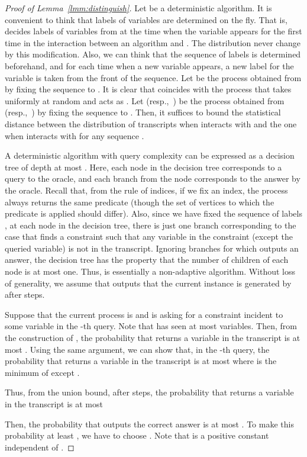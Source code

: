 \documentclass[letterpaper, 11pt]{article}
\begin{document}
\begin{proof}[Proof of Lemma~\ref{lmm:distinguish}]
  Let  be a deterministic algorithm.
  It is convenient to think that labels of variables are determined on the fly.
  That is,  decides labels of variables from  at the time when the variable appears for the first time in the interaction between an algorithm and .
  The distribution never change by this modification.
  Also, 
  we can think that the sequence of labels is determined beforehand,
  and for each time when a new variable appears,
  a new label for the variable is taken from the front of the sequence.
  Let  be the process obtained from  by fixing the sequence to .
  It is clear that  coincides with the process that takes  uniformly at random and acts as .
  Let  (resp.,~) be the process obtained from  (resp.,~) by fixing the sequence to .
  Then, it suffices to bound the statistical distance between the distribution of transcripts when  interacts with  and the one when  interacts with  for any sequence .

  A deterministic algorithm  with query complexity  can be expressed as a decision tree of depth at most .
  Here, each node in the decision tree corresponds to a query to the oracle,
  and each branch from the node corresponds to the answer by the oracle.
  Recall that, from the rule of indices,
  if we fix an index,
  the process always returns the same predicate (though the set of vertices to which the predicate is applied should differ).
  Also, 
  since we have fixed the sequence of labels ,
  at each node in the decision tree,  
  there is just one branch corresponding to the case that  finds a constraint such that any variable in the constraint (except the queried variable) is not in the transcript.
  Ignoring branches for which  outputs an answer,
  the decision tree has the property that the number of children of each node is at most one.
  Thus,  is essentially a non-adaptive algorithm.
  Without loss of generality,
  we assume that  outputs that the current instance is generated by  after  steps.
  
  Suppose that the current process is  and  is asking for a constraint incident to some variable in the -th query.
  Note that  has seen at most  variables.
  Then, from the construction of ,
  the probability that  returns a variable in the transcript is at most .
  Using the same argument,
  we can show that,
  in the -th query,
  the probability that  returns a variable in the transcript is at most  where  is the minimum of  except .
  
  Thus, from the union bound,
  after  steps,
  the probability that  returns a variable in the transcript is at most 
  
  Then, the probability that  outputs the correct answer is at most .
  To make this probability at least , we have to choose .
  Note that  is a positive constant independent of .
\end{proof}
\end{document}
